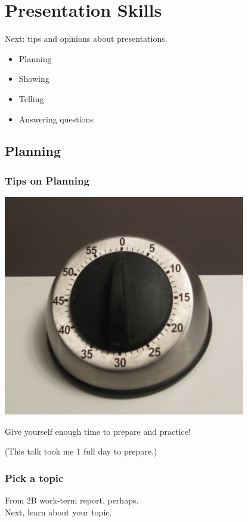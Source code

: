 \documentclass{beamer}
\begin{document}
\section{Presentation Skills}

\begin{frame}

{\Large
Next: tips and opinions about presentations.
}
\begin{itemize}
\item Planning
\item Showing
\item Telling
\item Answering questions
\end{itemize}

\end{frame}

\subsection{Planning}

\begin{frame}

\frametitle{Tips on Planning}

\begin{center}
\includegraphics[scale=0.25]{time}
\end{center}

Give yourself enough time to prepare and practice!

(This talk took me 1 full day to prepare.)

\end{frame}

\begin{frame}

\frametitle{Pick a topic}

\Large
From 2B work-term report, perhaps.\\[2em]

Next, learn about your topic.

\end{frame}
\end{document}

